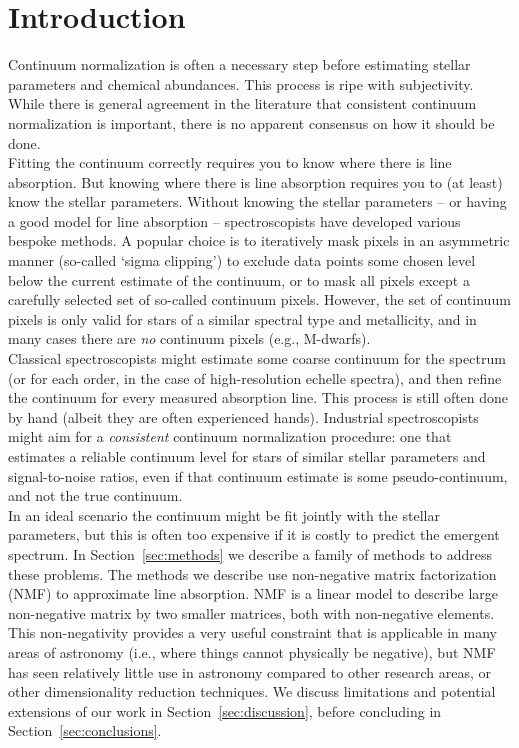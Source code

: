 \documentclass[modern]{aastex631}
\begin{document}
\section*{}\clearpage
\section{Introduction}\label{sec:intro}

Continuum normalization is often a necessary step before estimating stellar parameters and chemical abundances.
This process is ripe with subjectivity.
While there is general agreement in the literature that consistent continuum normalization is important, there is no apparent consensus on how it should be done.\\

Fitting the continuum correctly requires you to know where there is line absorption. But knowing where there is line absorption requires you to (at least) know the stellar parameters. Without knowing the stellar parameters -- or having a good model for line absorption -- spectroscopists have developed various bespoke methods. A popular choice is to iteratively mask pixels in an asymmetric manner (so-called `sigma clipping') to exclude data points some chosen level below the current estimate of the continuum, or to mask all pixels except a carefully selected set of so-called continuum pixels. However, the set of continuum pixels is only valid for stars of a similar spectral type and metallicity, and in many cases there are \emph{no} continuum pixels (e.g., M-dwarfs).\\

Classical spectroscopists might estimate some coarse continuum for the spectrum (or for each order, in the case of high-resolution echelle spectra), and then refine the continuum for every measured absorption line. This process is still often done by hand (albeit they are often experienced hands). Industrial spectroscopists might aim for a \emph{consistent} continuum normalization procedure: one that estimates a reliable continuum level for stars of similar stellar parameters and signal-to-noise ratios, even if that continuum estimate is some pseudo-continuum, and not the true continuum.\\

In an ideal scenario the continuum might be fit jointly with the stellar parameters, but this is often too expensive if it is costly to predict the emergent spectrum. In Section~\ref{sec:methods} we describe a family of methods to address these problems. 
The methods we describe use non-negative matrix factorization (NMF) to approximate line absorption. NMF is a linear model to describe large non-negative matrix by two smaller matrices, both with non-negative elements. This non-negativity provides a very useful constraint that is applicable in many areas of astronomy (i.e., where things cannot physically be negative), but NMF has seen relatively little use in astronomy compared to other research areas, or other dimensionality reduction techniques. 
We discuss limitations and potential extensions of our work in Section~\ref{sec:discussion}, before concluding in Section~\ref{sec:conclusions}.\\
\end{document}
